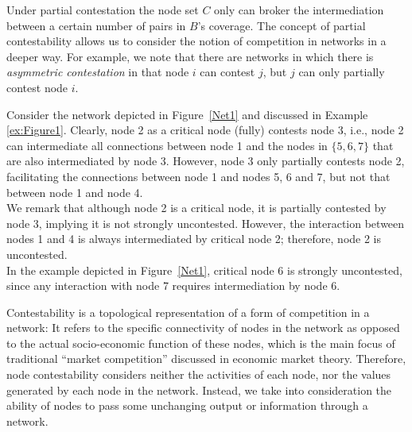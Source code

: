 Under partial contestation the node set $C$ only can broker the intermediation between a certain number of pairs in $B$'s coverage. The concept of partial contestability allows us to consider the notion of competition in networks in a deeper way. For example, we note that there are networks in which there is \emph{asymmetric contestation} in that node $i$ can contest $j$, but $j$ can only partially contest node $i$.
\begin{example}
Consider the network depicted in Figure~\ref{Net1} and discussed in Example \ref{ex:Figure1}. Clearly, node 2 as a critical node (fully) contests node 3, i.e., node 2 can intermediate all connections between node 1 and the nodes in $\{ 5,6,7 \}$ that are also intermediated by node 3. However, node 3 only partially contests node 2, facilitating the connections between node 1 and nodes 5, 6 and 7, but not that between node 1 and node 4.
\\
We remark that although node 2 is a critical node, it is partially contested by node 3, implying it is not strongly uncontested. However, the interaction between nodes 1 and 4 is always intermediated by critical node 2; therefore, node 2 is uncontested.
\\
In the example depicted in Figure~\ref{Net1}, critical node 6 is strongly uncontested, since any interaction with node 7 requires intermediation by node 6.
\end{example}
Contestability is a topological representation of a form of competition in a network: It refers to the specific connectivity of nodes in the network as opposed to the actual socio-economic function of these nodes, which is the main focus of traditional ``market competition'' discussed in economic market theory. Therefore, node contestability considers neither the activities of each node, nor the values generated by each node in the network. Instead, we take into consideration the ability of nodes to pass some unchanging output or information through a network.

